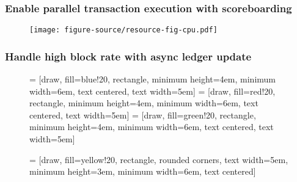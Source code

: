 \documentclass[svgnames]{beamer}
\begin{document}
\begin{frame}
    \frametitle{Enable parallel transaction execution with scoreboarding}
    \begin{figure}
        \centering
        \texttt{[image: figure-source/resource-fig-cpu.pdf]}
    \end{figure}
\end{frame}

\begin{frame}
    \frametitle{Handle high block rate with async ledger update}
    \begin{figure}
         = [draw, fill=blue!20, rectangle, 
        minimum height=4em, minimum width=6em, text centered, text width=5em]
         = [draw, fill=red!20, rectangle, minimum height=4em, minimum width=6em, text centered, text width=5em]
         = [draw, fill=green!20, rectangle, minimum height=4em, minimum width=6em, text centered, text width=5em]

         = [draw, fill=yellow!20, rectangle, rounded corners, text width=5em, minimum height=3em, minimum width=6em, text centered]


\end{figure}
\end{frame}
\end{document}
